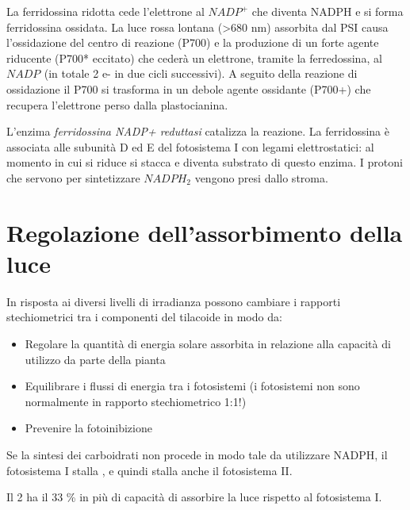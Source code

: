 \documentclass[a4paper,12pt]{book}
\begin{document}
La ferridossina ridotta cede l'elettrone al $NADP^{+}$ che diventa NADPH e si forma ferridossina ossidata.
La luce rossa lontana (>680 nm) assorbita dal PSI causa l’ossidazione del centro di reazione (P700) e la
produzione di un forte agente riducente (P700* eccitato) che cederà un elettrone, tramite la ferredossina, al $NADP^{}$
(in totale 2 e- in due cicli successivi). A seguito della reazione di ossidazione il P700 si trasforma in un debole 
agente ossidante (P700+) che recupera l’elettrone perso dalla plastocianina.

L'enzima \emph{ferridossina NADP+ reduttasi} catalizza la reazione. La ferridossina è associata alle subunità D ed E del fotosistema I con legami elettrostatici: al momento in cui si riduce si stacca e diventa substrato di questo enzima.
I protoni che servono per sintetizzare $NADPH_{2}$ vengono presi dallo stroma.

\section{Regolazione dell'assorbimento della luce}

In risposta ai diversi livelli di irradianza possono cambiare i rapporti stechiometrici tra i componenti del tilacoide in modo da:
\begin{itemize}
\item{Regolare la quantità di energia solare assorbita in relazione alla capacità di utilizzo da parte della pianta}
\item{Equilibrare i flussi di energia tra i fotosistemi (i fotosistemi non sono normalmente in rapporto stechiometrico 1:1!)}
\item{Prevenire la fotoinibizione}
\end{itemize}

Se la sintesi dei carboidrati non procede in modo tale da utilizzare NADPH, il fotosistema I stalla , e quindi stalla anche il fotosistema II.

Il 2 ha il 33 \% in più di capacità di assorbire la luce rispetto al fotosistema I.
\end{document}
